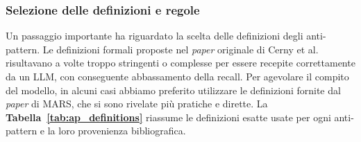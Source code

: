 \vspace{1em}
\subsubsection*{Selezione delle definizioni e regole}
Un passaggio importante ha riguardato la scelta delle definizioni degli anti-pattern. Le definizioni formali proposte nel \textit{paper} originale di Cerny et al. risultavano a volte troppo stringenti o complesse per essere recepite correttamente da un LLM, con conseguente abbassamento della recall. Per agevolare il compito del modello, in alcuni casi abbiamo preferito utilizzare le definizioni fornite dal \textit{paper} di MARS, che si sono rivelate più pratiche e dirette. La \textbf{Tabella~\ref{tab:ap_definitions}} riassume le definizioni esatte usate per ogni anti-pattern e la loro provenienza bibliografica.


